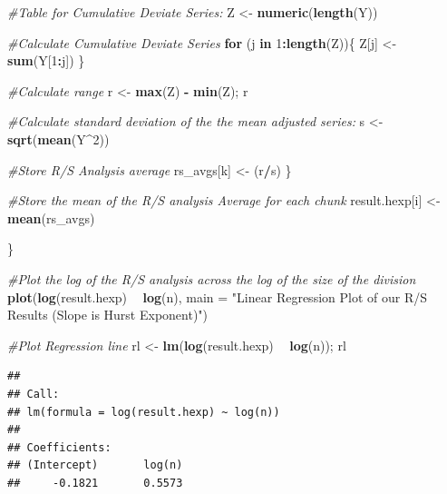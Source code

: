 \documentclass[]{article}
\newenvironment{Shaded}{\begin{snugshade}}{\end{snugshade}}
\newcommand{\CommentTok}[1]{\textcolor[rgb]{0.56,0.35,0.01}{\textit{#1}}}
\newcommand{\ControlFlowTok}[1]{\textcolor[rgb]{0.13,0.29,0.53}{\textbf{#1}}}
\newcommand{\DataTypeTok}[1]{\textcolor[rgb]{0.13,0.29,0.53}{#1}}
\newcommand{\DecValTok}[1]{\textcolor[rgb]{0.00,0.00,0.81}{#1}}
\newcommand{\KeywordTok}[1]{\textcolor[rgb]{0.13,0.29,0.53}{\textbf{#1}}}
\newcommand{\NormalTok}[1]{#1}
\newcommand{\OperatorTok}[1]{\textcolor[rgb]{0.81,0.36,0.00}{\textbf{#1}}}
\newcommand{\StringTok}[1]{\textcolor[rgb]{0.31,0.60,0.02}{#1}}
\begin{document}
\begin{Shaded}
\begin{Highlighting}[]
    \CommentTok{#Table for Cumulative Deviate Series:}
\NormalTok{    Z <-}\StringTok{ }\KeywordTok{numeric}\NormalTok{(}\KeywordTok{length}\NormalTok{(Y))}
    
    \CommentTok{#Calculate Cumulative Deviate Series}
    \ControlFlowTok{for}\NormalTok{ (j }\ControlFlowTok{in} \DecValTok{1}\OperatorTok{:}\KeywordTok{length}\NormalTok{(Z))\{}
\NormalTok{      Z[j] <-}\StringTok{ }\KeywordTok{sum}\NormalTok{(Y[}\DecValTok{1}\OperatorTok{:}\NormalTok{j])}
\NormalTok{    \}}
    
    \CommentTok{#Calculate range}
\NormalTok{    r <-}\StringTok{ }\KeywordTok{max}\NormalTok{(Z) }\OperatorTok{-}\StringTok{ }\KeywordTok{min}\NormalTok{(Z); r}
    
    \CommentTok{#Calculate standard deviation of the the mean adjusted series:}
\NormalTok{    s <-}\StringTok{ }\KeywordTok{sqrt}\NormalTok{(}\KeywordTok{mean}\NormalTok{(Y}\OperatorTok{^}\DecValTok{2}\NormalTok{))}
    
    \CommentTok{#Store R/S Analysis average}
\NormalTok{    rs_avgs[k] <-}\StringTok{ }\NormalTok{(r}\OperatorTok{/}\NormalTok{s)}
\NormalTok{  \}}
  
  \CommentTok{#Store the mean of the R/S analysis Average for each chunk}
\NormalTok{  result.hexp[i] <-}\StringTok{ }\KeywordTok{mean}\NormalTok{(rs_avgs)}
  
\NormalTok{\}}

\CommentTok{#Plot the log of the R/S analysis across the log of the size of the division}
\KeywordTok{plot}\NormalTok{(}\KeywordTok{log}\NormalTok{(result.hexp) }\OperatorTok{~}\StringTok{ }\KeywordTok{log}\NormalTok{(n), }\DataTypeTok{main =} \StringTok{"Linear Regression Plot of our R/S Results (Slope is Hurst Exponent)"}\NormalTok{)}

\CommentTok{#Plot Regression line}
\NormalTok{rl <-}\StringTok{ }\KeywordTok{lm}\NormalTok{(}\KeywordTok{log}\NormalTok{(result.hexp) }\OperatorTok{~}\StringTok{ }\KeywordTok{log}\NormalTok{(n)); rl}
\end{Highlighting}
\end{Shaded}

\begin{verbatim}
## 
## Call:
## lm(formula = log(result.hexp) ~ log(n))
## 
## Coefficients:
## (Intercept)       log(n)  
##     -0.1821       0.5573
\end{verbatim}

\begin{Shaded}
\end{Shaded}
\end{document}
